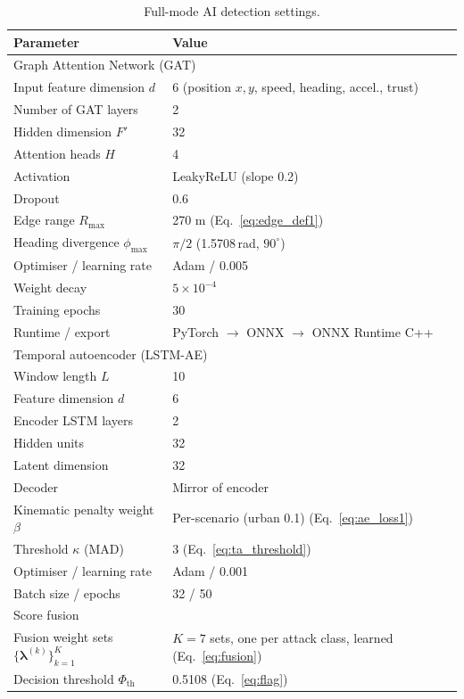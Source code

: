\documentclass[12pt, a4paper]{report}
\begin{document}
\begin{table}[H]
\centering
\caption{Full-mode AI detection settings.}
\label{tab:set-fullmode-ai}
\renewcommand{\arraystretch}{1.15}
\begin{tabular}{|l|l|}
\hline
\textbf{Parameter} & \textbf{Value} \\
\hline
\multicolumn{2}{l}{Graph Attention Network (GAT)} \\
\hline
Input feature dimension $d$        & 6 (position $x,y$, speed, heading, accel., trust) \\
\hline
Number of GAT layers               & 2 \\
\hline
Hidden dimension $F'$              & 32 \\
\hline
Attention heads $H$                & 4 \\
\hline
Activation                         & LeakyReLU (slope 0.2) \\
\hline
Dropout                            & 0.6 \\
\hline
Edge range $R_{\max}$              & 270 m (Eq.~\ref{eq:edge_def1}) \\
\hline
Heading divergence $\phi_{\max}$   & $\pi/2$ (1.5708\,rad, $90^\circ$) \\
\hline
Optimiser / learning rate          & Adam / 0.005 \\
\hline
Weight decay                       & $5\times10^{-4}$ \\
\hline
Training epochs                    & 30 \\
\hline
Runtime / export                   & PyTorch $\rightarrow$ ONNX $\rightarrow$ ONNX Runtime C++ \\
\hline
\multicolumn{2}{l}{Temporal autoencoder (LSTM-AE)} \\
\hline
Window length $L$                  & 10 \\
\hline
Feature dimension $d$              & 6 \\
\hline
Encoder LSTM layers                & 2 \\
\hline
Hidden units                       & 32 \\
\hline
Latent dimension                   & 32 \\
\hline
Decoder                            & Mirror of encoder \\
\hline
Kinematic penalty weight $\beta$   & Per-scenario (urban 0.1) (Eq.~\ref{eq:ae_loss1}) \\
\hline
Threshold $\kappa$ (MAD)           & 3 (Eq.~\ref{eq:ta_threshold}) \\
\hline
Optimiser / learning rate          & Adam / 0.001 \\
\hline
Batch size / epochs                & 32 / 50 \\
\hline
\multicolumn{2}{l}{Score fusion} \\
\hline
Fusion weight sets $\{\boldsymbol{\lambda}^{(k)}\}_{k=1}^{K}$ & $K{=}7$ sets, one per attack class, learned (Eq.~\ref{eq:fusion}) \\
\hline
Decision threshold $\Phi_{\mathrm{th}}$        & 0.5108 (Eq.~\ref{eq:flag}) \\
\hline
\end{tabular}
\end{table}
\end{document}
